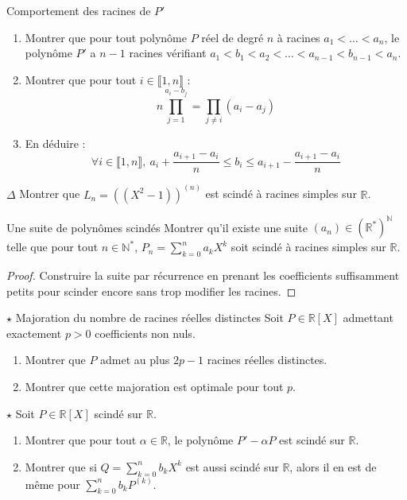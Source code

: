 \documentclass[french,a4paper]{article}
\newcommand{\N}{\mathbb{N}}
\newcommand{\R}{\mathbb{R}}
\newcommand{\st}{^*}
\theoremstyle{plain}
\theoremstyle{definition}
\theoremstyle{remark}
\begin{document}
\begin{ex}[Moulin.28]{Comportement des racines de $P'$}
	\begin{enumerate}
		\item Montrer que pour tout polynôme $P$ réel de degré $n$ à racines $a_1<\ldots<a_n$, le polynôme $P'$ a $n-1$ racines vérifiant $a_1<b_1<a_2<\ldots<a_{n-1}<b_{n-1}<a_n$.
		\item Montrer que pour tout $i\in\llbracket1,n\rrbracket$ : $$n\prod_{j=1}^{a_i-b_j}=\prod_{j\ne i}(a_i-a_j)$$
		\item En déduire : $$\forall i\in\llbracket1,n\rrbracket,\ a_i+\frac{a_{i+1}-a_i}{n}\leqslant b_i\leqslant a_{i+1}-\frac{a_{i+1}-a_i}{n}$$
	\end{enumerate}
\end{ex}

\begin{ex}[Moulin.29]{$\Delta$}
	Montrer que $L_n=\left((X^2-1)\right)^{(n)}$ est scindé à racines simples sur $\R$.
\end{ex}

\begin{ex}[Moulin.30]{Une suite de polynômes scindés}
	Montrer qu'il existe une suite $(a_n)\in(\R\st)^\N$ telle que pour tout $n\in\N\st$, $P_n=\displaystyle\sum_{k=0}^{n}a_kX^k$ soit scindé à racines simples sur $\R$.
\end{ex}
\begin{proof}
	Construire la suite par récurrence en prenant les coefficients suffisamment petits pour scinder encore sans trop modifier les racines.
\end{proof}

\begin{ex}[Moulin.31]{$\star$ Majoration du nombre de racines réelles distinctes}
	Soit $P\in\R[X]$ admettant exactement $p>0$ coefficients non nuls.
	\begin{enumerate}
		\item Montrer que $P$ admet au plus $2p-1$ racines réelles distinctes.
		\item Montrer que cette majoration est optimale pour tout $p$.
	\end{enumerate}
\end{ex}

\begin{ex}[Moulin.32]{$\star$}
	Soit $P\in\R[X]$ scindé sur $\R$.
	\begin{enumerate}
		\item Montrer que pour tout $\alpha\in\R$, le polynôme $P'-\alpha P$ est scindé sur $\R$.
		\item Montrer que si $Q=\displaystyle\sum_{k=0}^{n}b_kX^k$ est aussi scindé sur $\R$, alors il en est de même pour $\displaystyle\sum_{k=0}^{n}b_kP^{(k)}$.
	\end{enumerate}
\end{ex}
\end{document}
